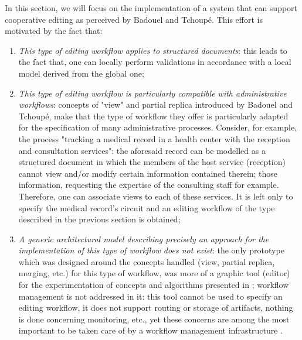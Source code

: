 In this section, we will focus on the implementation of a system that can support cooperative editing as perceived by Badouel and Tchoup\'e. This effort is motivated by the fact that: 
\begin{enumerate}
\item \textit{This type of editing workflow applies to structured documents}: 
this leads to the fact that, one can locally perform validations in accordance with a local model derived from the global one;
\item \textit{This type of editing workflow is particularly compatible with administrative workflows}: concepts of "view" and partial replica introduced by Badouel and Tchoupé, make that the type of workflow they offer is particularly adapted for the specification of many administrative processes. Consider, for example, the process "tracking a medical record in a health center with the reception and consultation services": the aforesaid record can be modelled as a structured document in which the members of the host service (reception) cannot view and/or modify certain information contained therein; those information, requesting the expertise of the consulting staff for example. Therefore, one can associate views to each of these services. It is left only to specify the medical record's circuit and an editing workflow of the type described in the previous section is obtained;
\item \textit{A generic architectural model describing precisely an approach for the implementation of this type of workflow does not exist}: the only prototype \cite{artTinyCE} which was designed around the concepts handled (view, partial replica, merging, etc.) for this type of workflow, was more of a graphic tool (editor) for the experimentation of concepts and algorithms presented in \cite{badouelTchoupeCmcs}; workflow management is not addressed in it: this tool cannot be used to specify an editing workflow, it does not support routing or storage of artifacts, nothing is done concerning monitoring, etc., yet these concerns are among the most important to be taken care of by a workflow management infrastructure \cite{ima}.
\end{enumerate}


\label{chap2:sec:archi-proposed-architecture}


